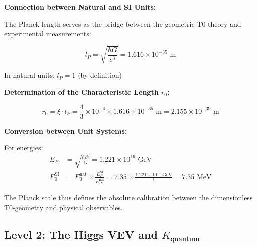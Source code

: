 \documentclass[12pt,a4paper]{article}
\newcommand{\xipar}{\xi}
\newcommand{\Kquantum}{K_{\text{quantum}}}
\begin{document}
	\begin{keyresult}
		\textbf{Connection between Natural and SI Units:}
		
		The Planck length serves as the bridge between the geometric T0-theory and experimental measurements:
		
		\begin{equation}
			l_P = \sqrt{\frac{\hbar G}{c^3}} = 1.616 \times 10^{-35} \text{ m}
		\end{equation}
		
		In natural units: $l_P = 1$ (by definition)
		
		\textbf{Determination of the Characteristic Length $r_0$:}
		
		\begin{equation}
			r_0 = \xipar \cdot l_P = \frac{4}{3} \times 10^{-4} \times 1.616 \times 10^{-35} \text{ m} = 2.155 \times 10^{-39} \text{ m}
		\end{equation}
		
		\textbf{Conversion between Unit Systems:}
		
		For energies:
		\begin{align}
			E_P &= \sqrt{\frac{\hbar c^5}{G}} = 1.221 \times 10^{19} \text{ GeV} \\
			E_0^{\text{SI}} &= E_0^{\text{nat}} \times \frac{E_P^{\text{SI}}}{E_P^{\text{nat}}} = 7.35 \times \frac{1.221 \times 10^{19} \text{ GeV}}{1} = 7.35 \text{ MeV}
		\end{align}
		
		The Planck scale thus defines the absolute calibration between the dimensionless T0-geometry and physical observables.
	\end{keyresult}
	
	\subsection{Level 2: The Higgs VEV and $\Kquantum$}
	
\end{document}
